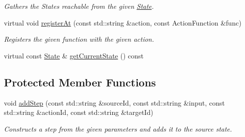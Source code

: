 \begin{DoxyCompactItemize}
\begin{DoxyCompactList}\small\item\em Gathers the States reachable from the given \hyperlink{classfsml_1_1State}{State}. \end{DoxyCompactList}\item 
virtual void \hyperlink{classfsml_1_1Machine_a51b789ab95db22995529818bed9fef20}{register\-At} (const std\-::string \&action, const Action\-Function \&func)
\begin{DoxyCompactList}\small\item\em Registers the given function with the given action. \end{DoxyCompactList}\item 
virtual const \hyperlink{classfsml_1_1State}{State} \& \hyperlink{classfsml_1_1Machine_a5bce113183b6d59b652b33f4369bb45c}{get\-Current\-State} () const 
\end{DoxyCompactItemize}
\subsection*{Protected Member Functions}
\begin{DoxyCompactItemize}
\item 
void \hyperlink{classfsml_1_1Machine_a863ac1a16a82e0fc0a8e85553061686f}{add\-Step} (const std\-::string \&source\-Id, const std\-::string \&input, const std\-::string \&action\-Id, const std\-::string \&target\-Id)
\begin{DoxyCompactList}\small\item\em Constructs a step from the given parameters and adds it to the source state. \end{DoxyCompactList}\end{DoxyCompactItemize}
